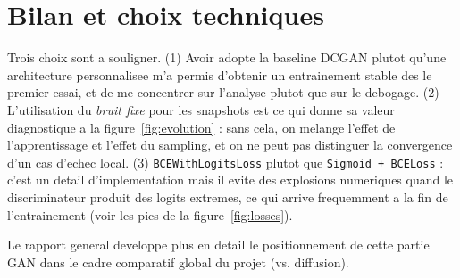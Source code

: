\documentclass[11pt,a4paper]{article}
\begin{document}
\section{Bilan et choix techniques}

Trois choix sont a souligner. (1) Avoir adopte la baseline DCGAN plutot qu'une architecture personnalisee m'a permis d'obtenir un entrainement stable des le premier essai, et de me concentrer sur l'analyse plutot que sur le debogage. (2) L'utilisation du \emph{bruit fixe} pour les snapshots est ce qui donne sa valeur diagnostique a la figure~\ref{fig:evolution} : sans cela, on melange l'effet de l'apprentissage et l'effet du sampling, et on ne peut pas distinguer la convergence d'un cas d'echec local. (3) \texttt{BCEWithLogitsLoss} plutot que \texttt{Sigmoid + BCELoss} : c'est un detail d'implementation mais il evite des explosions numeriques quand le discriminateur produit des logits extremes, ce qui arrive frequemment a la fin de l'entrainement (voir les pics de la figure~\ref{fig:losses}).

Le rapport general developpe plus en detail le positionnement de cette partie GAN dans le cadre comparatif global du projet (vs. diffusion).
\end{document}
